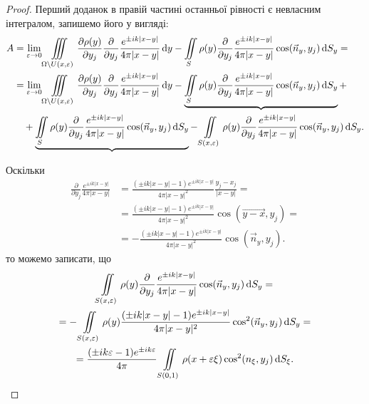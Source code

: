 \begin{proof}
	Перший доданок в правій частині останньої рівності є невласним інтегралом, запишемо його у вигляді:
	\begin{equation}
		\begin{aligned}
			A &= \displaystyle\lim\limits_{\varepsilon \to 0} \displaystyle\iiint\limits_{\Omega \setminus U(x, \varepsilon)} \frac{\partial \rho(y)}{\partial y_j} \frac{\partial}{\partial y_j} \frac{e^{\pm i k |x - y|}}{4 \pi |x - y|} \mathop{}\!\mathrm{d} y - \displaystyle\iint\limits_S \rho(y) \frac{\partial}{\partial y_j} \frac{e^{\pm i k |x - y|}}{4 \pi |x - y|} \cos(\vec n_y, y_j) \mathop{}\!\mathrm{d} S_y = \\
			&= \displaystyle\lim\limits_{\varepsilon \to 0} \displaystyle\iiint\limits_{\Omega \setminus U(x, \varepsilon)} \frac{\partial \rho(y)}{\partial y_j} \frac{\partial}{\partial y_j} \frac{e^{\pm i k |x - y|}}{4 \pi |x - y|} \mathop{}\!\mathrm{d} y - \underbrace{\displaystyle\iint\limits_S \rho(y) \frac{\partial}{\partial y_j} \frac{e^{\pm i k |x - y|}}{4 \pi |x - y|} \cos(\vec n_y, y_j) \mathop{}\!\mathrm{d} S_y} + \\
			& \quad + \underbrace{\displaystyle\iint\limits_S \rho(y) \frac{\partial}{\partial y_j} \frac{e^{\pm i k |x - y|}}{4 \pi |x - y|} \cos(\vec n_y, y_j) \mathop{}\!\mathrm{d} S_y} - \displaystyle\iint\limits_{S(x, \varepsilon)} \rho(y) \frac{\partial}{\partial y_j} \frac{e^{\pm i k |x - y|}}{4 \pi |x - y|} \cos(\vec n_y, y_j) \mathop{}\!\mathrm{d} S_y.
		\end{aligned}
	\end{equation} 

	Оскільки
	\begin{equation}
		\begin{aligned}
			\frac{\partial}{\partial y_j} \frac{e^{\pm i k |x - y|}}{4 \pi |x - y|} &= \frac{(\pm i k |x - y| - 1) e^{\pm i k |x - y|}}{4 \pi |x - y|^2} \frac{y_j - x_j}{|x - y|} = \\
			&= \frac{(\pm i k |x - y| - 1) e^{\pm i k |x - y|}}{4 \pi |x - y|^2} \cos(\vec{y - x}, y_j) = \\
			&= -\frac{(\pm i k |x - y| - 1) e^{\pm i k |x - y|}}{4 \pi |x - y|^2} \cos(\vec n_y, y_j).
		\end{aligned}
	\end{equation}
	то можемо записати, що  
	\begin{multline}
		\displaystyle\iint\limits_{S(x, \varepsilon)} \rho(y) \frac{\partial}{\partial y_j} \frac{e^{\pm i k |x - y|}}{4 \pi |x - y|} \cos(\vec n_y, y_j) \mathop{}\!\mathrm{d} S_y = \\ 
		= - \displaystyle\iint\limits_{S(x, \varepsilon)} \rho(y) \frac{(\pm i k |x - y| - 1) e^{\pm i k |x - y|}}{4 \pi |x - y|^2} \cos^2(\vec n_y, y_j) \mathop{}\!\mathrm{d} S_y = \\
		= \frac{(\pm i k \varepsilon - 1) e^{\pm i k \varepsilon}}{4 \pi} \displaystyle\iint\limits_{S(0, 1)} \rho(x + \varepsilon \xi) \cos^2(n_\xi, y_j) \mathop{}\!\mathrm{d} S_\xi.
	\end{multline}


\end{proof}
